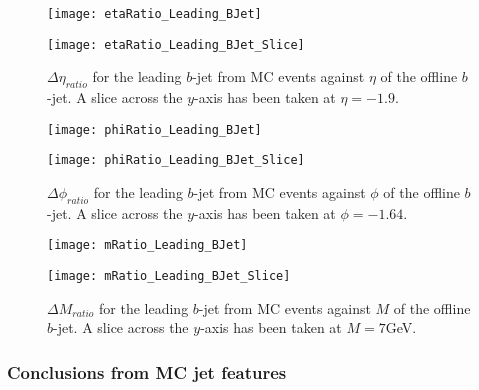 		\begin{figure}[h]
			\centering

			\begin{minipage}[h]{0.33\linewidth}
				\texttt{[image: etaRatio\_Leading\_BJet]}
			\end{minipage}
			\quad
			\begin{minipage}[h]{0.33\linewidth}
				\texttt{[image: etaRatio\_Leading\_BJet\_Slice]}
			\end{minipage}
			\caption{$\Delta \eta_{ratio}$ for the leading \pt $b$-jet from MC events against $\eta$ of the offline $b$-jet. A slice across the $y$-axis has been taken at $\eta=-1.9$. }
			\label{fig:MC:leadingbeta}
		\end{figure}

			\begin{figure}[h]
				\centering

				\begin{minipage}[h]{0.33\linewidth}
					\texttt{[image: phiRatio\_Leading\_BJet]}
				\end{minipage}
				\quad
				\begin{minipage}[h]{0.33\linewidth}
					\texttt{[image: phiRatio\_Leading\_BJet\_Slice]}
				\end{minipage}
			\caption{$\Delta \phi_{ratio}$ for the leading \pt $b$-jet from MC events against $\phi$ of the offline $b$-jet. A slice across the $y$-axis has been taken at $\phi=-1.64$. }
			\label{fig:MC:leadingbphi}
			\end{figure}

			\begin{figure}[h]
				\centering

				\begin{minipage}[h]{0.33\linewidth}
					\texttt{[image: mRatio\_Leading\_BJet]}
				\end{minipage}
				\quad
				\begin{minipage}[h]{0.33\linewidth}
					\texttt{[image: mRatio\_Leading\_BJet\_Slice]}
				\end{minipage}
			\caption{$\Delta M_{ratio}$ for the leading \pt $b$-jet from MC events against $M$ of the offline $b$-jet. A slice across the $y$-axis has been taken at $M=7$GeV. }
			\label{fig:MC:leadingbm}
			\end{figure}

		\subsubsection{Conclusions from MC jet features}

